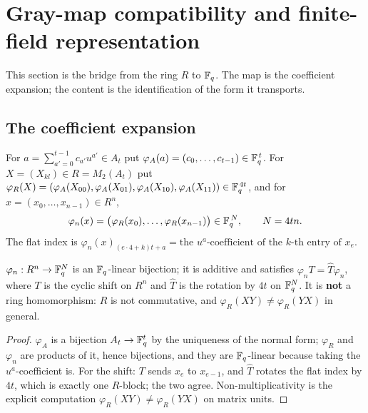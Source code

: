 \section{Gray-map compatibility and finite-field representation}
\label{sec:gray}

This section is the bridge from the ring $R$ to $\mathbb F_q$. The map is the
coefficient expansion; the content is the identification of the form it
transports.

\subsection{The coefficient expansion}

\begin{definition}\label{def:gray}
For $a=\sum_{a'=0}^{t-1}c_{a'}u^{a'}\in A_t$ put
$\varphi_A(a)=(c_0,\dots,c_{t-1})\in\mathbb F_q^{\,t}$. For
$X=(X_{kl})\in R=M_2(A_t)$ put
$\varphi_R(X)=(\varphi_A(X_{00}),\varphi_A(X_{01}),\varphi_A(X_{10}),
\varphi_A(X_{11}))\in\mathbb F_q^{\,4t}$, and for $x=(x_0,\dots,x_{n-1})\in R^n$,
\[
  \varphi_n(x)=\bigl(\varphi_R(x_0),\dots,\varphi_R(x_{n-1})\bigr)
  \in\mathbb F_q^{\,N},\qquad N=4tn .
\]
The flat index is $\varphi_n(x)_{(e\cdot4+k)t+a}=
\text{the $u^a$-coefficient of the $k$-th entry of }x_e$.
\end{definition}

\begin{lemma}\label{lem:philin}
$\varphi_n:R^n\to\mathbb F_q^{N}$ is an $\mathbb F_q$-linear bijection; it is additive
and satisfies $\varphi_nT=\widehat T\varphi_n$, where $T$ is the cyclic shift
on $R^n$ and $\widehat T$ is the rotation by $4t$ on $\mathbb F_q^{N}$. It is
\textbf{not} a ring homomorphism: $R$ is not commutative, and
$\varphi_R(XY)\ne\varphi_R(YX)$ in general.
\end{lemma}

\begin{proof}
$\varphi_A$ is a bijection $A_t\to\mathbb F_q^t$ by the uniqueness of the normal form;
$\varphi_R$ and $\varphi_n$ are products of it, hence bijections, and they are
$\mathbb F_q$-linear because taking the $u^a$-coefficient is. For the shift:
$T$ sends $x_e$ to $x_{e-1}$, and $\widehat T$ rotates the flat index by $4t$,
which is exactly one $R$-block; the two agree. Non-multiplicativity is the
explicit computation $\varphi_R(XY)\ne\varphi_R(YX)$ on matrix units.
\end{proof}

